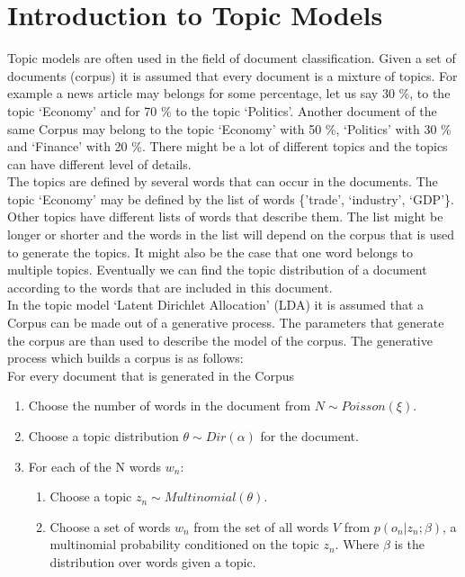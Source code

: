 \section{Introduction to Topic Models}
Topic models are often used in the field of document classification. Given a set of documents (corpus) it is assumed that every document is a mixture of topics. For example a news article may belongs for some percentage, let us say 30 \%,  to the topic `Economy' and for 70 \%  to the topic `Politics'. Another document of the same Corpus may belong to the topic `Economy' with 50 \%, `Politics' with 30 \% and `Finance' with 20 \%. There might be a lot of different topics and the topics can have different level of details. \\
The topics are defined by several words that can occur in the documents. The topic `Economy' may be defined by the list of words \{'trade', `industry', `GDP'\}. Other topics have different lists of words that describe them. The list might be longer or shorter and the words in the list will depend on the corpus that is used to generate the topics. It might also be the case that one word belongs to multiple topics. Eventually we can find the topic distribution of a document according to the words that are included in this document.\\
In the topic model `Latent Dirichlet Allocation' (LDA) it is assumed that a Corpus can be made out of a generative process. The parameters that generate the corpus are than used to describe the model of the corpus. The generative process which builds a corpus is as follows:\\
For every document that is generated in the Corpus
\begin{enumerate}
 \item Choose the number of words in the document from $N \sim Poisson(\xi)$.
 \item Choose a topic distribution $\theta \sim Dir(\alpha)$ for the document.
 \item For each of the N words $w_n$:
 
 \begin{enumerate}
  \item Choose a topic $z_n \sim Multinomial(\theta)$.
  \item Choose a set of words $w_n$ from the set of all words $V$ from $p(o_n |z_n;\beta)$, a multinomial probability conditioned on the topic $z_n$. Where $\beta$ is the distribution over words given a topic.
 \end{enumerate}

\end{enumerate}

